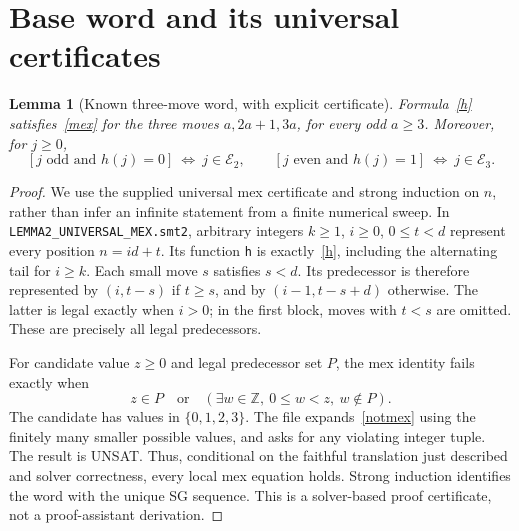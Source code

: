 \documentclass[10pt,a4paper]{article}
\newcommand{\E}{\mathcal E}
\newtheorem{lemma}{Lemma}
\begin{document}
\section{Base word and its universal certificates}
\begin{lemma}[Known three-move word, with explicit certificate]\label{base}
Formula~\eqref{h} satisfies~\eqref{mex} for the three moves $a,2a+1,3a$, for every odd $a\ge3$. Moreover, for $j\ge0$,
\begin{equation}\label{binary}
 [j\text{ odd and }h(j)=0]\ \Longleftrightarrow\ j\in\E_2,\qquad
 [j\text{ even and }h(j)=1]\ \Longleftrightarrow\ j\in\E_3.
\end{equation}
\end{lemma}
\begin{proof}
We use the supplied universal mex certificate and strong induction on $n$, rather than infer an infinite statement from a finite numerical sweep. In \texttt{LEMMA2\_UNIVERSAL\_MEX.smt2}, arbitrary integers $k\ge1$, $i\ge0$, $0\le t<d$ represent every position $n=id+t$. Its function \texttt{h} is exactly~\eqref{h}, including the alternating tail for $i\ge k$. Each small move $s$ satisfies $s<d$. Its predecessor is therefore represented by $(i,t-s)$ if $t\ge s$, and by $(i-1,t-s+d)$ otherwise. The latter is legal exactly when $i>0$; in the first block, moves with $t<s$ are omitted. These are precisely all legal predecessors.

For candidate value $z\ge0$ and legal predecessor set $P$, the mex identity fails exactly when
\begin{equation}\label{notmex}
 z\in P\quad\text{or}\quad (\exists w\in\mathbb Z,\ 0\le w<z,\ w\notin P).
\end{equation}
The candidate has values in $\{0,1,2,3\}$. The file expands~\eqref{notmex} using the finitely many smaller possible values, and asks for any violating integer tuple. The result is UNSAT. Thus, conditional on the faithful translation just described and solver correctness, every local mex equation holds. Strong induction identifies the word with the unique SG sequence. This is a solver-based proof certificate, not a proof-assistant derivation.


\end{proof}
\end{document}
